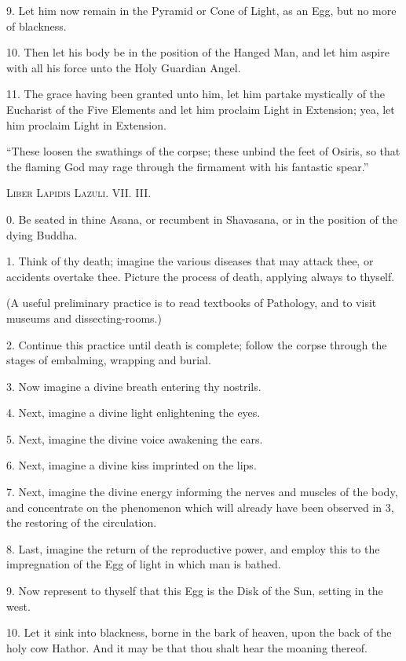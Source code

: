 9. Let him now remain in the Pyramid or Cone of Light, as an Egg, but no more of blackness.

10. Then let his body be in the position of the Hanged Man, and let him aspire with all his force unto the Holy Guardian Angel.

11. The grace having been granted unto him, let him partake mystically of the Eucharist of the Five Elements and let him proclaim Light in Extension; yea, let him proclaim Light in Extension.


\pagebreak



\epigraph{\enquote{These loosen the swathings of the corpse; these unbind the feet of Osiris, so that the flaming God may rage through the firmament with his fantastic spear.}}{\textsc{Liber Lapidis Lazuli. VII. III.}}

0. Be seated in thine Asana, or recumbent in Shavasana, or in the position of the dying Buddha.

1. Think of thy death; imagine the various diseases that may attack thee, or accidents overtake thee. Picture the process of death, applying always to thyself.

(A useful preliminary practice is to read textbooks of Pathology, and to visit museums and dissecting-rooms.)

2. Continue this practice until death is complete; follow the corpse through the stages of embalming, wrapping and burial.

3. Now imagine a divine breath entering thy nostrils.

4. Next, imagine a divine light enlightening the eyes.

5. Next, imagine the divine voice awakening the ears.

6. Next, imagine a divine kiss imprinted on the lips.

7. Next, imagine the divine energy informing the nerves and muscles of the body, and concentrate on the phenomenon which will already have been observed in 3, the restoring of the circulation.

8. Last, imagine the return of the reproductive power, and employ this to the impregnation of the Egg of light in which man is bathed.

9. Now represent to thyself that this Egg is the Disk of the Sun, setting in the west.

10. Let it sink into blackness, borne in the bark of heaven, upon the back of the holy cow Hathor. And it may be that thou shalt hear the moaning thereof.

